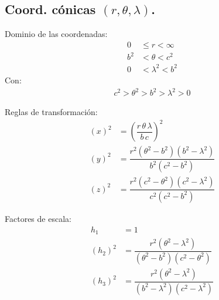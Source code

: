 \documentclass[12pt]{article}
\numberwithin{equation}{section}
\begin{document}
\subsection{Coord. cónicas \texorpdfstring{$(r, \theta, \lambda)$}{(r, t, l)}.}

Dominio de las coordenadas:
\begin{align*}
0 &\leq r < \infty \\
b^{2} &< \theta < c^{2} \\
0 &< \lambda^{2} < b^{2}
\end{align*}
Con:
\begin{align*}
c^{2} > \theta^{2} > b^{2} > \lambda^{2} > 0
\end{align*}

Reglas de transformación:
\begin{align*}
(x)^{2} &= \left( \dfrac{r \, \theta \, \lambda}{b \, c} \right)^{2} \\[0.5em]
(y)^{2} &= \dfrac{r^{2} (\theta^{2} - b^{2})(b^{2} - \lambda^{2})}{b^{2}(c^{2} - b^{2})} \\[0.5em]
(z)^{2} &= \dfrac{r^{2} (c^{2} - \theta^{2})(c^{2} - \lambda^{2})}{c^{2} (c^{2} - b^{2})}
\end{align*}

Factores de escala:
\begin{align*}
h_{1} &= 1\\
(h_{2})^{2} &= \dfrac{r^{2} (\theta^{2} - \lambda^{2})}{(\theta^{2} - b^{2})(c^{2} - \theta^{2})} \\[0.5em]
(h_{3})^{2} &= \dfrac{r^{2} (\theta^{2} - \lambda^{2})}{(b^{2} - \lambda^{2})(c^{2} - \lambda^{2})}
\end{align*}
\end{document}

